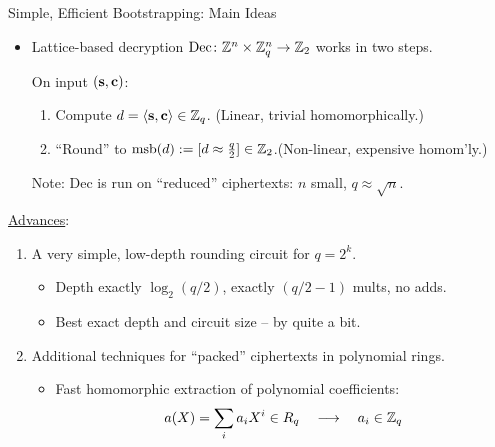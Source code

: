 \documentclass[shadow,xcolor=pdftex,svgnames,table,t]{beamer}
\begin{document}
\begin{frame}{Simple, Efficient Bootstrapping: Main Ideas}
  \begin{itemize}
  \item Lattice-based decryption $\text{Dec} \colon \mathbb{Z}^{n} \times
    \mathbb{Z}_q^{n} \to \mathbb{Z}_{2}$ works in two steps.

    \medskip
    On input $(\mathbf{s}, \mathbf{c})$:

    \begin{enumerate}
    \item Compute $d = \langle\mathbf{s}, \mathbf{c}\rangle \in \mathbb{Z}_q$. \hfill (Linear,
      trivial homomorphically.)

      \medskip
    \item ``Round'' to $\text{msb}(d) := [d \approx \frac{q}{2}] \in
      \mathbb{Z}_{2}$.\hfill (\alert{Non-linear, expensive homom'ly.})
    \end{enumerate}

    \smallskip
    Note: $\text{Dec}$ is run on ``reduced'' ciphertexts: $n$ small, $q
    \approx \sqrt{n}$.
  \end{itemize}

  \uline{Advances}:
  \begin{enumerate}
  \item A very \alert{simple}, \alert{low-depth} rounding circuit for
    $q=2^{k}$.

    \begin{itemize}
    \item Depth exactly $\log_{2}(q/2)$, exactly $(q/2-1)$ mults, no adds.
      \smallskip
    \item Best exact depth and circuit size -- by quite a bit.
    \end{itemize}

    \medskip
  \item Additional techniques for ``\alert{packed}'' ciphertexts in
    polynomial rings.

    \begin{itemize}
    \item Fast homomorphic extraction of polynomial coefficients:
      \[ a(X) = \sum_{i} a_{i} X^{i} \in R_{q} \quad \longrightarrow \quad
      a_{i} \in \mathbb{Z}_{q} \]
    \end{itemize}
  \end{enumerate}
\end{frame}
\end{document}
